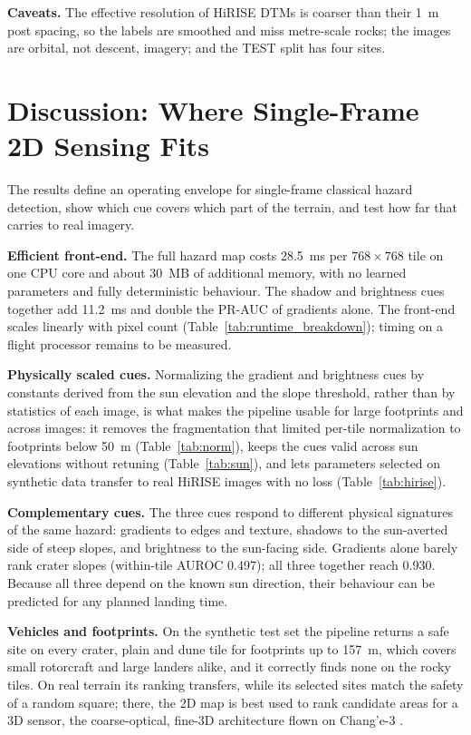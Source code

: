 \documentclass{article}
\begin{document}
\textbf{Caveats.} The effective resolution of HiRISE DTMs is coarser than their 1~m post spacing, so the labels are smoothed and miss metre-scale rocks; the images are orbital, not descent, imagery; and the TEST split has four sites.

\section{Discussion: Where Single-Frame 2D Sensing Fits}
The results define an operating envelope for single-frame classical hazard detection, show which cue covers which part of the terrain, and test how far that carries to real imagery.

\textbf{Efficient front-end.} The full hazard map costs 28.5~ms per $768 \times 768$ tile on one CPU core and about 30~MB of additional memory, with no learned parameters and fully deterministic behaviour. The shadow and brightness cues together add 11.2~ms and double the PR-AUC of gradients alone. The front-end scales linearly with pixel count (Table~\ref{tab:runtime_breakdown}); timing on a flight processor remains to be measured.

\textbf{Physically scaled cues.} Normalizing the gradient and brightness cues by constants derived from the sun elevation and the slope threshold, rather than by statistics of each image, is what makes the pipeline usable for large footprints and across images: it removes the fragmentation that limited per-tile normalization to footprints below 50~m (Table~\ref{tab:norm}), keeps the cues valid across sun elevations without retuning (Table~\ref{tab:sun}), and lets parameters selected on synthetic data transfer to real HiRISE images with no loss (Table~\ref{tab:hirise}).

\textbf{Complementary cues.} The three cues respond to different physical signatures of the same hazard: gradients to edges and texture, shadows to the sun-averted side of steep slopes, and brightness to the sun-facing side. Gradients alone barely rank crater slopes (within-tile AUROC 0.497); all three together reach 0.930. Because all three depend on the known sun direction, their behaviour can be predicted for any planned landing time.

\textbf{Vehicles and footprints.} On the synthetic test set the pipeline returns a safe site on every crater, plain and dune tile for footprints up to 157~m, which covers small rotorcraft and large landers alike, and it correctly finds none on the rocky tiles. On real terrain its ranking transfers, while its selected sites match the safety of a random square; there, the 2D map is best used to rank candidate areas for a 3D sensor, the coarse-optical, fine-3D architecture flown on Chang'e-3 \cite{li2016change3}.
\end{document}
